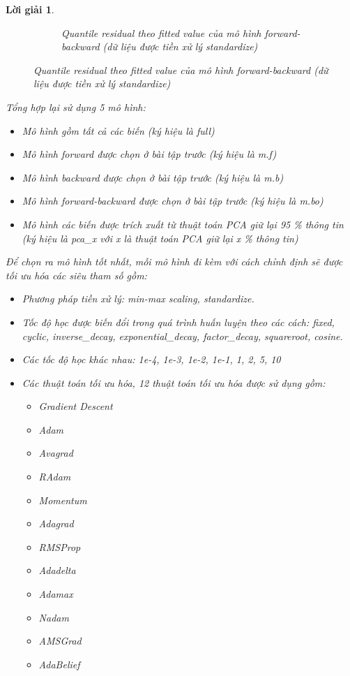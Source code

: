 \documentclass[14pt, a4paper]{article}
\theoremstyle{sltheorem}
\theoremstyle{soltheorem}
\newtheorem*{loigiai}{Lời giải}
\begin{document}
\begin{loigiai}
\begin{figure}[h!]
\begin{subfigure}[b]{0.4\textwidth}
            \caption{Quantile residual theo fitted value của mô hình forward-backward (dữ liệu được tiền xử lý standardize)}
        \end{subfigure}
        \label{fig:Quantile-fitted-mbo}
    \end{figure}

    Tổng hợp lại sử dụng 5 mô hình:

    \begin{itemize}
        \item Mô hình gồm tất cả các biến (ký hiệu là full)
        \item Mô hình forward được chọn ở bài tập trước (ký hiệu là m.f)
        \item Mô hình backward được chọn ở bài tập trước (ký hiệu là m.b)
        \item Mô hình forward-backward được chọn ở bài tập trước (ký hiệu là m.bo)
        \item Mô hình các biến được trích xuất từ thuật toán PCA giữ lại 95 \% thông tin (ký hiệu là pca\_x với x là thuật toán PCA giữ lại x \% thông tin)
    \end{itemize}

    Để chọn ra mô hình tốt nhất, mỗi mô hình đi kèm với cách chỉnh định sẽ được tối ưu hóa các siêu tham số gồm:

    \begin{itemize}
        \item Phương pháp tiền xử lý: min-max scaling, standardize.
        \item Tốc độ học được biến đổi trong quá trình huấn luyện theo các cách: fixed, cyclic, inverse\_decay, exponential\_decay, factor\_decay, squareroot, cosine.
        \item Các tốc độ học khác nhau: 1e-4, 1e-3, 1e-2, 1e-1, 1, 2, 5, 10
        \item Các thuật toán tối ưu hóa, 12 thuật toán tối ưu hóa được sử dụng gồm:
        \begin{itemize}
            \item Gradient Descent
            \item Adam
            \item Avagrad
            \item RAdam
            \item Momentum
            \item Adagrad
            \item RMSProp
            \item Adadelta
            \item Adamax
            \item Nadam
            \item AMSGrad
            \item AdaBelief
        \end{itemize}


\end{itemize}
\end{loigiai}
\end{document}
